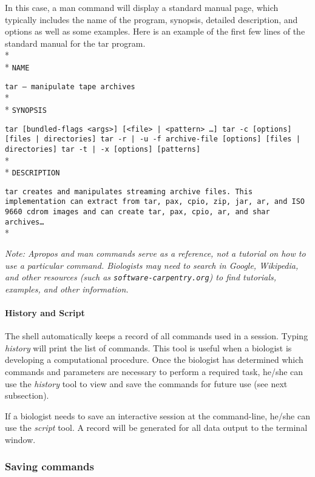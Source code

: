 \documentclass[ChapterTOCs,krantz2]{krantz} %
\begin{document}
\noindent
In this case, a man command will display a standard manual page, which
typically includes the name of the program, synopsis, detailed description, and
options as well as some examples. Here is an example of the first few lines of
the standard manual for the tar program.\\* \\*
\texttt{NAME}

\texttt{tar -- manipulate tape archives}\\* \\*
\texttt{SYNOPSIS}

\texttt{tar [bundled-flags <args>] [<file> | <pattern> \ldots] tar {-c}
[options] [files | directories] tar {-r | -u} -f archive-file [options] [files
| directories] tar {-t | -x} [options] [patterns]}\\* \\*
\texttt{DESCRIPTION}

\texttt{tar creates and manipulates streaming archive files.  This
implementation can extract from tar, pax, cpio, zip, jar, ar, and ISO 9660
cdrom images and can create tar, pax, cpio, ar, and shar archives\ldots}\\*

\noindent
\textsl{Note: Apropos and man commands serve as a reference, not a tutorial on how to use
a particular command. Biologists may need to search in Google,
Wikipedia, and other resources (such as \texttt{software-carpentry.org}) 
to find tutorials, examples, and other information.}

\paragraph{History and Script}

The shell automatically keeps a record of all commands used 
in a session.  Typing \emph{history} will print the list of commands.  
This tool is useful when a biologist is developing a computational procedure.  
Once the biologist has determined which commands and parameters 
are necessary to perform a required 
task, he/she can use the \emph{history} tool to view and save the commands for 
future use (see next subsection).

If a biologist needs to save an interactive session at the command-line, 
he/she can use the \emph{script} tool.  A record will be generated 
for all data output to the terminal window.

\subsubsection{Saving commands}
\end{document}
